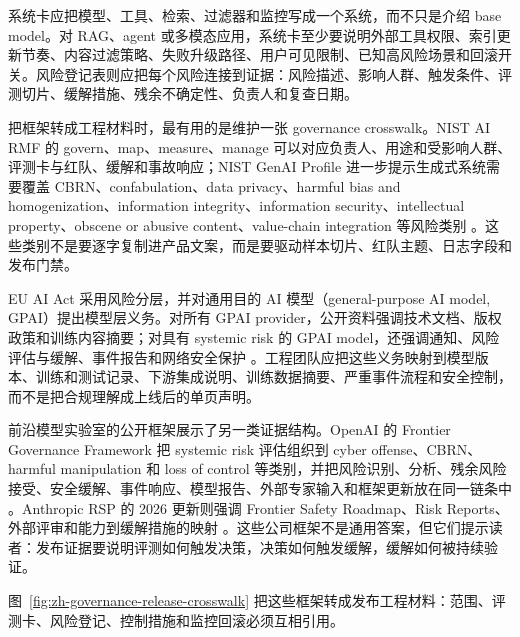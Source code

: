\documentclass[UTF8,zihao=-4,openany]{ctexbook}
\begin{document}
系统卡应把模型、工具、检索、过滤器和监控写成一个系统，而不只是介绍 base model。对 RAG、agent 或多模态应用，系统卡至少要说明外部工具权限、索引更新节奏、内容过滤策略、失败升级路径、用户可见限制、已知高风险场景和回滚开关。风险登记表则应把每个风险连接到证据：风险描述、影响人群、触发条件、评测切片、缓解措施、残余不确定性、负责人和复查日期。

把框架转成工程材料时，最有用的是维护一张 governance crosswalk。NIST AI RMF 的 govern、map、measure、manage 可以对应负责人、用途和受影响人群、评测卡与红队、缓解和事故响应；NIST GenAI Profile 进一步提示生成式系统需要覆盖 CBRN、confabulation、data privacy、harmful bias and homogenization、information integrity、information security、intellectual property、obscene or abusive content、value-chain integration 等风险类别 \cite{nist2023airmf,nist2024genai}。这些类别不是要逐字复制进产品文案，而是要驱动样本切片、红队主题、日志字段和发布门禁。

EU AI Act 采用风险分层，并对通用目的 AI 模型（general-purpose AI model, GPAI）提出模型层义务。对所有 GPAI provider，公开资料强调技术文档、版权政策和训练内容摘要；对具有 systemic risk 的 GPAI model，还强调通知、风险评估与缓解、事件报告和网络安全保护 \cite{europeanunion2024aiact}。工程团队应把这些义务映射到模型版本、训练和测试记录、下游集成说明、训练数据摘要、严重事件流程和安全控制，而不是把合规理解成上线后的单页声明。

前沿模型实验室的公开框架展示了另一类证据结构。OpenAI 的 Frontier Governance Framework 把 systemic risk 评估组织到 cyber offense、CBRN、harmful manipulation 和 loss of control 等类别，并把风险识别、分析、残余风险接受、安全缓解、事件响应、模型报告、外部专家输入和框架更新放在同一链条中 \cite{openai2026frontiergovernance}。Anthropic RSP 的 2026 更新则强调 Frontier Safety Roadmap、Risk Reports、外部评审和能力到缓解措施的映射 \cite{anthropic2026rspv3}。这些公司框架不是通用答案，但它们提示读者：发布证据要说明评测如何触发决策，决策如何触发缓解，缓解如何被持续验证。

图~\ref{fig:zh-governance-release-crosswalk} 把这些框架转成发布工程材料：范围、评测卡、风险登记、控制措施和监控回滚必须互相引用。
\end{document}
